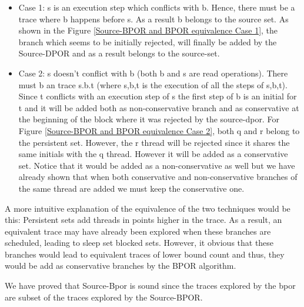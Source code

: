 \begin{itemize}
\item Case 1: s is an execution step which conflicts with b. Hence, there must be a trace where b happens before s. As a result b belongs to the source set.
As shown in the Figure \ref{Source-BPOR and BPOR equivalence Case 1}, the branch which seems to be initially rejected, will finally be added by the Source-DPOR and as a result belongs to the source-set.
   
\item Case 2: 
   s doesn’t conflict with b (both b and s are read operations). There must b an trace s.b.t (where s,b,t is the execution
   of all the steps of s,b,t). 
   Since t conflicts with an execution step of s the ﬁrst step of b is an initial for t and it will be added both as non-conservative branch and 
   as conservative at the beginning of the block where it was rejected by the source-dpor. For Figure \ref{Source-BPOR and BPOR equivalence Case 2}, both q and r belong to the persistent set. However,
   the r thread will be rejected since it shares the same initials with the q thread. However it will be added as a conservative set. Notice that it would be added as a
   non-conservative as well but we have already shown that when both conservative and non-conservative branches of the same thread are added we must keep the conservative one.

\end{itemize}
   
A more intuitive explanation of the equivalence of the two techniques would be this: Persistent sets add threads in points higher in the trace. As a result, an equivalent trace
may have already been explored when these branches are scheduled, leading to sleep set blocked sets. However, it obvious that these branches would lead to equivalent traces of
lower bound count and thus, they would be add as conservative branches by the BPOR algorithm.

We have proved that Source-Bpor is sound since the traces explored by the bpor are subset of the traces explored by the Source-BPOR.
